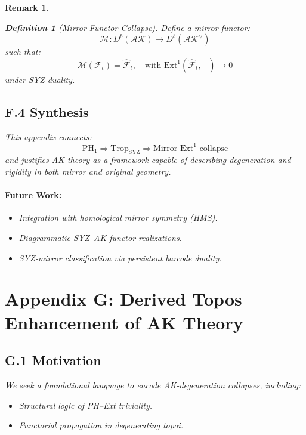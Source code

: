\documentclass[11pt]{article}
\newtheorem{definition}[theorem]{Definition}
\newtheorem{remark}[theorem]{Remark}
\begin{document}
\begin{remark}
\begin{definition}[Mirror Functor Collapse]
Define a mirror functor:
\[
\mathcal{M}: D^b(\mathcal{AK}) \to D^b(\mathcal{AK}^\vee)
\]
such that:
\[
\mathcal{M}(\mathcal{F}_t) = \widehat{\mathcal{F}}_t, \quad \text{with } \mathrm{Ext}^1(\widehat{\mathcal{F}}_t, -) \to 0
\]
under SYZ duality.
\end{definition}

\subsection*{F.4 Synthesis}

This appendix connects:
\[
\mathrm{PH}_1 \Rightarrow \mathrm{Trop}_{\mathrm{SYZ}} \Rightarrow \text{Mirror } \mathrm{Ext}^1 \text{ collapse}
\]
and justifies AK-theory as a framework capable of describing degeneration and rigidity in both mirror and original geometry.

\paragraph{Future Work:}
\begin{itemize}
  \item Integration with homological mirror symmetry (HMS).
  \item Diagrammatic SYZ–AK functor realizations.
  \item SYZ-mirror classification via persistent barcode duality.
\end{itemize}


\section*{Appendix G: Derived Topos Enhancement of AK Theory}

\subsection*{G.1 Motivation}
We seek a foundational language to encode AK-degeneration collapses, including:
\begin{itemize}
  \item Structural logic of PH–Ext triviality.
  \item Functorial propagation in degenerating topoi.
\end{itemize}


\end{remark}
\end{document}

